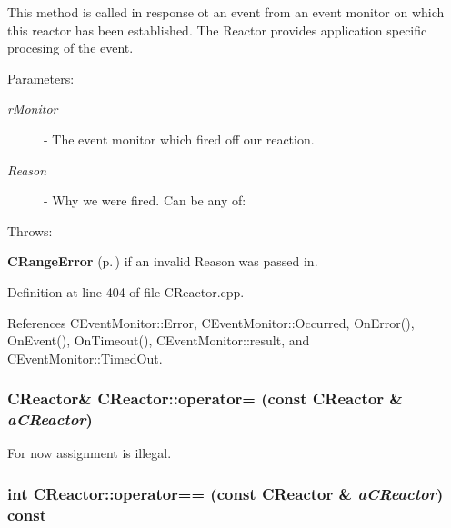 This method is called in response ot an event from an event monitor on which this reactor has been established. The Reactor provides  application specific procesing of the event.\begin{Desc}
\item[Parameters: ]\par
\begin{description}
\item[{\em 
r\-Monitor}]- The event monitor which fired off our reaction. \item[{\em 
Reason}]- Why we were fired. Can be any of:
\end{description}
\end{Desc}
Throws:\begin{CompactItemize}
\item 
{\bf CRange\-Error} {\rm (p.\,\pageref{classCRangeError})} if an invalid Reason was passed in. \end{CompactItemize}


Definition at line 404 of file CReactor.cpp.

References CEvent\-Monitor::Error, CEvent\-Monitor::Occurred, On\-Error(), On\-Event(), On\-Timeout(), CEvent\-Monitor::result, and CEvent\-Monitor::Timed\-Out.
\subsubsection{\setlength{\rightskip}{0pt plus 5cm}CReactor\& CReactor::operator= (const CReactor \& {\em a\-CReactor})\hspace{0.3cm}{\tt  [private]}}\label{classCReactor_c1}


For now assignment is illegal.

\subsubsection{\setlength{\rightskip}{0pt plus 5cm}int CReactor::operator== (const CReactor \& {\em a\-CReactor}) const}\label{classCReactor_a4}




